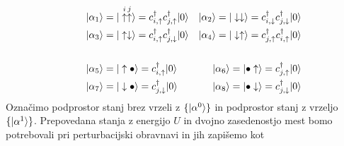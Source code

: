 {\begin{appendices}
\begin{equation}\label{eq:stanja}
\begin{aligned}\qquad
&\vert\alpha_1\rangle= \vert  \overset{i}{\uparrow} \overset{j}{\uparrow}\rangle=c^\dagger_{i,\uparrow}c^\dagger_{j,\uparrow}\vert0\rangle & \vert\alpha_2\rangle=\vert \downarrow \downarrow\rangle=c^\dagger_{i,\downarrow}c^\dagger_{j,\downarrow}\vert0\rangle\\
&\vert\alpha_3\rangle=\vert \uparrow \downarrow \rangle=c^\dagger_{i,\uparrow}c^\dagger_{j,\downarrow}\vert0\rangle &\vert\alpha_4\rangle=\vert \downarrow \uparrow \rangle=c^\dagger_{j,\uparrow}c^\dagger_{i,\uparrow}\vert0\rangle \\\\
&\vert\alpha_5\rangle= \vert\uparrow \bullet\rangle=c^\dagger_{i,\uparrow}\vert0\rangle &\vert\alpha_6\rangle=\vert \bullet  \uparrow\rangle=c^\dagger_{j,\uparrow}\vert0\rangle\\
&\vert\alpha_7\rangle=\vert\downarrow \bullet\rangle=c^\dagger_{j,\downarrow}\vert0\rangle&\vert\alpha_8\rangle=\vert \bullet  \downarrow \rangle=c^\dagger_{j,\downarrow}\vert0\rangle\\
\end{aligned}
\end{equation}
Označimo podprostor stanj brez vrzeli z $\{ \vert\alpha^0\rangle\}$ in podprostor stanj z vrzeljo $\{ \vert\alpha^1\rangle\}$.
Prepovedana stanja z energijo $U$ in dvojno zasedenostjo mest bomo potrebovali pri perturbacijski obravnavi in jih zapišemo  kot 
\begin{equation}\label{eq:vzbujena}

\end{equation}
\end{appendices}}

